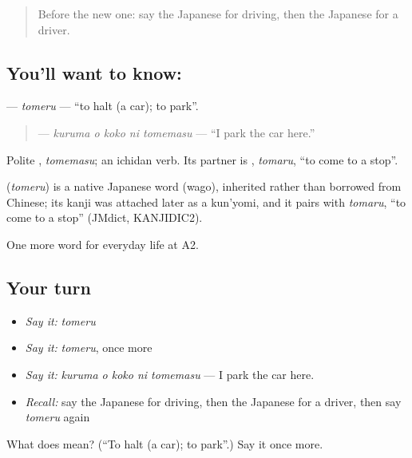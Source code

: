 \begin{quote}
Before the new one: say the Japanese for driving, then the Japanese for a driver.
\end{quote}

\subsection*{You'll want to know: }
\textbf{} — \emph{tomeru} — \textquotedblleft{}to halt (a car); to park\textquotedblright{}.

\begin{quote}
\textbf{  } — \emph{kuruma o koko ni tomemasu} — \textquotedblleft{}I park the car here.\textquotedblright{}
\end{quote}

Polite \textbf{}, \emph{tomemasu}; an ichidan verb. Its partner is \textbf{}, \emph{tomaru}, \textquotedblleft{}to come to a stop\textquotedblright{}.

\begin{cousinweb}
\textbf{} (\emph{tomeru}) is a native Japanese word (wago), inherited rather than borrowed from Chinese; its kanji was attached later as a kun'yomi, and it pairs with \emph{tomaru}, \textquotedblleft{}to come to a stop\textquotedblright{} (JMdict, KANJIDIC2).
\end{cousinweb}

\begin{grammarlens}[title={What you've built}]
One more word for everyday life at A2.
\end{grammarlens}

\subsection*{Your turn}
\begin{itemize}
\raggedright
  \item \emph{Say it:} \emph{tomeru}
  \item \emph{Say it:} \emph{tomeru}, once more
  \item \emph{Say it:} \emph{kuruma o koko ni tomemasu} — I park the car here.
  \item \emph{Recall:} say the Japanese for driving, then the Japanese for a driver, then say \emph{tomeru} again
\end{itemize}

\begin{tcolorbox}[breakable,colback=teal!4,colframe=teal!35!black,title={Before you move on}]
What does  mean? (\textquotedblleft{}To halt (a car); to park\textquotedblright{}.) Say it once more.
\end{tcolorbox}
